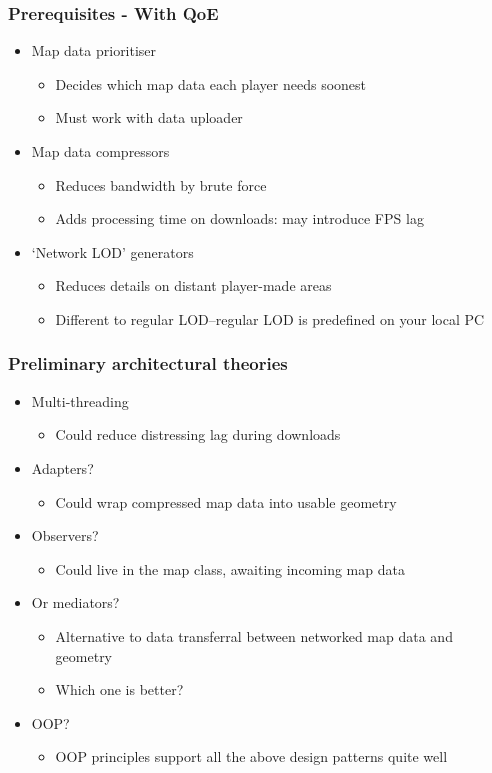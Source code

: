 \documentclass{beamer}
\begin{document}
\begin{frame}
\frametitle{Prerequisites - With QoE}
\begin{itemize}
	\item Map data prioritiser
	\begin{itemize}
		\item Decides which map data each player needs soonest
		\item Must work with data uploader
	\end{itemize}
	\item Map data compressors
	\begin{itemize}
		\item Reduces bandwidth by brute force
		\item Adds processing time on downloads: may introduce FPS lag
	\end{itemize}
	\item `Network LOD' generators
	\begin{itemize}
		\item Reduces details on distant player-made areas
		\item Different to regular LOD--regular LOD is predefined on your local PC
	\end{itemize}
\end{itemize}
\end{frame}

\begin{frame}
\frametitle{Preliminary architectural theories}
\begin{itemize}
\item Multi-threading
\begin{itemize}
	\item Could reduce distressing lag during downloads
\end{itemize}
\item Adapters?
\begin{itemize}
	\item Could wrap compressed map data into usable geometry
\end{itemize}
\item Observers?
\begin{itemize}
	\item Could live in the map class, awaiting incoming map data
\end{itemize}
\item Or mediators?
\begin{itemize}
	\item Alternative to data transferral between networked map data and geometry
	\item Which one is better?
\end{itemize}
\item OOP?
\begin{itemize}
	\item OOP principles support all the above design patterns quite well
\end{itemize}
\end{itemize}
\end{frame}
\end{document}
